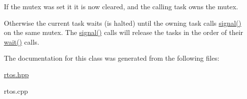 If the mutex was set it it is now cleared, and the calling task owns the mutex.

Otherwise the current task waits (is halted) until the owning task calls \hyperlink{classrtos_1_1mutex_ad57303013f03da5856e54f331323dc5d}{signal()} on the same mutex. The \hyperlink{classrtos_1_1mutex_ad57303013f03da5856e54f331323dc5d}{signal()} calls will release the tasks in the order of their \hyperlink{classrtos_1_1mutex_af005eb2964192bbdf1a444eab11eb683}{wait()} calls. 

The documentation for this class was generated from the following files\+:\begin{DoxyCompactItemize}
\item 
\hyperlink{rtos_8hpp}{rtos.\+hpp}\item 
rtos.\+cpp\end{DoxyCompactItemize}
